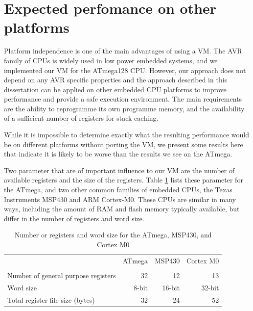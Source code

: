 \section{Expected perfomance on other platforms}
\label{sec-evaluation-other-platforms}
Platform independence is one of the main advantages of using a VM. The AVR family of CPUs is widely used in low power embedded systems, and we implemented our VM for the ATmega128 CPU. However, our approach does not depend on any AVR specific properties and the approach described in this dissertation can be applied on other embedded CPU platforms to improve performance and provide a safe execution environment. The main requirements are the ability to reprogramme its own programme memory, and the availability of a sufficient number of registers for stack caching.

While it is impossible to determine exactly what the resulting performance would be on different platforms without porting the VM, we present some results here that indicate it is likely to be worse than the results we see on the ATmega.

Two parameter that are of important influence to our VM are the number of available registers and the size of the registers. Table \ref{tbl-ATmega-msp430-m0-registers} lists these parameter for the ATmega, and two other common families of embedded CPUs, the Texas Instruments MSP430 and ARM Cortex-M0. These CPUs are similar in many ways, including the amount of RAM and flash memory typically available, but differ in the number of registers and word size.

\begin{table}
\caption{Number or registers and word size for the ATmega, MSP430, and Cortex M0}
\label{tbl-ATmega-msp430-m0-registers}
    \begin{tabular}{lrrr} %
    \toprule
                                           & ATmega       & MSP430     & Cortex M0 \\
                                           & \cite{Atmel:ATmega128Datasheet, Atmel:AVRInstructionSetManual}
                                           & \cite{TexasInstrumentsIncorporated:MSP430F1611Datasheet, TexasInstrumentsIncorporated:MSP430x1xxUsersGuide}
                                           & \cite{ARM:2009vz} \\
    \midrule
    \midrule
    Number of general purpose registers    & 32           & 12         & 13        \\
    Word size                              & 8-bit        & 16-bit     & 32-bit    \\
    Total register file size (bytes)       & 32           & 24         & 52        \\
    \bottomrule
    \end{tabular}
\end{table}

